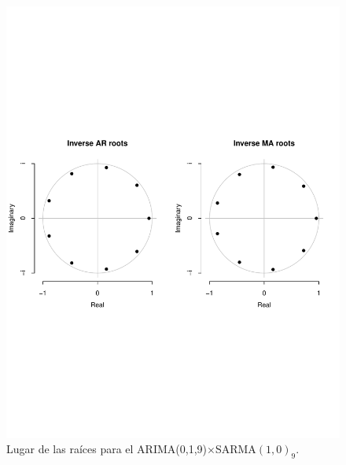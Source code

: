 \documentclass[conference]{IEEEtran}
\begin{document}
\begin{figure}[t]
    \centering
    \includegraphics[width=\columnwidth]{figs/Sar1stationary.pdf}
    \caption{Lugar de las raíces para el ARIMA(0,1,9)$\times$SARMA$(1,0)_9$.}
    \label{fig:Inverti3}
\end{figure}
\end{document}
